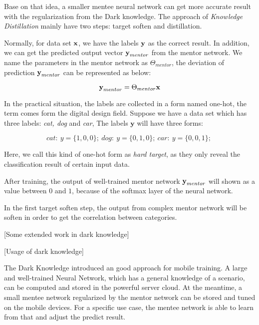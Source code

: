 \documentclass[article]{aaltoseries}
\begin{document}
Base on that idea, a smaller mentee neural network can get more accurate result with the regularization from
the Dark knowledge. 
The approach of \emph{Knowledge Distillation} mainly have two steps: target soften and distillation.

Normally, for data set \(\textbf x \), we have the labels \(\textbf y\) as the correct result.
In addition, we can get the predicted output vector \(\textbf y_{mentor}\) from the mentor network.
We name the parameters in the mentor network as \(\Theta_{mentor}\), 
the deviation of prediction \(\textbf y_{mentor}\) can be represented as below:

\[
  \textbf y_{mentor} = \Theta_{mentor} \textbf{x}
\]


In the practical situation, the labels are collected in a form named one-hot, the term comes form the digital
design field\cite{DigitalDesign}. Suppose we have a data set which has three labels: \emph{cat, dog} and \emph{car},
The labels \(\textbf{y}\) will have three forms:

\[
  cat:\ y = \{1,0,0\};\ 
  dog:\ y = \{0,1,0\};\ 
  car:\ y = \{0,0,1\};\ 
\]

Here, we call this kind of one-hot form as \emph{hard target}, as they only reveal the classification result of certain input data.

After training, the output of well-trained mentor network \(\textbf y_{mentor}\) will shown as a value between 
\(0\) and \(1\), because of the softmax layer \cite{SoftMax} of the neural network. 






In the first target soften step, 
the output from complex mentor network will be soften in order to get the correlation between categories.






[Some extended work in dark knowledge]

[Usage of dark knowledge]

The Dark Knowledge introduced an good approach for mobile training. 
A large and well-trained Neural Network, which has a general knowledge of a scenario, can be computed and stored in the powerful server cloud.
At the meantime, a small mentee network regularized by the mentor network can be stored and tuned on the mobile devices.
For a specific use case, the mentee network is able to learn from that and adjust the predict result. 
\end{document}
